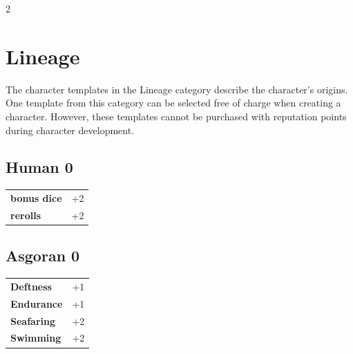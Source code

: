 \label{ch:appendix-templates}

\begin{multicols}{2}

\section{Lineage}

The character templates in the Lineage category describe the character's origins. One template from this category can be selected free of charge when creating a character. However, these templates cannot be purchased with reputation points during character development.

\begin{tcolorbox}
    \subsection*{Human \hfill \small{0 }}
    \tcblower




\begin{tabular}{@{}ll@{}}
    \textbf{bonus dice} & +2\\
    \textbf{rerolls} & +2\\
\end{tabular}


\end{tcolorbox}

\begin{tcolorbox}
    \subsection*{Asgoran \hfill \small{0 }}
    \tcblower




\begin{tabular}{@{}ll@{}}
    \textbf{Deftness} & +1\\
    \textbf{Endurance} & +1\\
    \textbf{Seafaring} & +2\\
    \textbf{Swimming} & +2\\
\end{tabular}



\end{tcolorbox}
\end{multicols}
